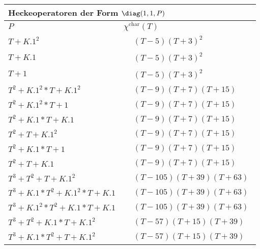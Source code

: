 \begin{tabular}{| l | l |}
\multicolumn{2}{l}{\bf Heckeoperatoren der Form $\diag(1,1,P)$} \\
\hline
$P$ & $\chi^\text{char}(T)$ \\
\hline
$T + K.1^2$ &
$\!\begin{aligned}
	&(T - 5)(T + 3)^{2}\end{aligned}$ \\
\hline
$T + K.1$ &
$\!\begin{aligned}
	&(T - 5)(T + 3)^{2}\end{aligned}$ \\
\hline
$T + 1$ &
$\!\begin{aligned}
	&(T - 5)(T + 3)^{2}\end{aligned}$ \\
\hline
$T^2 + K.1^2*T + K.1^2$ &
$\!\begin{aligned}
	&(T - 9)(T + 7)(T + 15)\end{aligned}$ \\
\hline
$T^2 + K.1^2*T + 1$ &
$\!\begin{aligned}
	&(T - 9)(T + 7)(T + 15)\end{aligned}$ \\
\hline
$T^2 + K.1*T + K.1$ &
$\!\begin{aligned}
	&(T - 9)(T + 7)(T + 15)\end{aligned}$ \\
\hline
$T^2 + T + K.1^2$ &
$\!\begin{aligned}
	&(T - 9)(T + 7)(T + 15)\end{aligned}$ \\
\hline
$T^2 + K.1*T + 1$ &
$\!\begin{aligned}
	&(T - 9)(T + 7)(T + 15)\end{aligned}$ \\
\hline
$T^2 + T + K.1$ &
$\!\begin{aligned}
	&(T - 9)(T + 7)(T + 15)\end{aligned}$ \\
\hline
$T^3 + T^2 + T + K.1^2$ &
$\!\begin{aligned}
	&(T - 105)(T + 39)(T + 63)\end{aligned}$ \\
\hline
$T^3 + K.1*T^2 + K.1^2*T + K.1$ &
$\!\begin{aligned}
	&(T - 105)(T + 39)(T + 63)\end{aligned}$ \\
\hline
$T^3 + K.1^2*T^2 + K.1*T + K.1$ &
$\!\begin{aligned}
	&(T - 105)(T + 39)(T + 63)\end{aligned}$ \\
\hline
$T^3 + T^2 + K.1*T + K.1^2$ &
$\!\begin{aligned}
	&(T - 57)(T + 15)(T + 39)\end{aligned}$ \\
\hline
$T^3 + K.1*T^2 + T + K.1^2$ &
$\!\begin{aligned}
	&(T - 57)(T + 15)(T + 39)\end{aligned}$ \\
\hline
\end{tabular}


